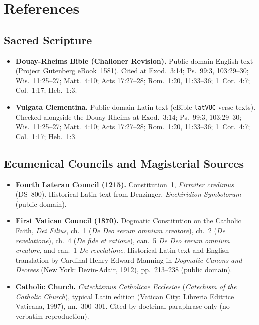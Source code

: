 \section{References}

\subsection*{Sacred Scripture}

\begin{itemize}
\item \textbf{Douay-Rheims Bible (Challoner Revision).} Public-domain English text (Project Gutenberg eBook~1581). Cited at Exod.~3:14; Ps.~99:3, 103:29--30; Wis.~11:25--27; Matt.~4:10; Acts 17:27--28; Rom.~1:20, 11:33--36; 1~Cor.~4:7; Col.~1:17; Heb.~1:3.
\item \textbf{Vulgata Clementina.} Public-domain Latin text (eBible \texttt{latVUC} verse texts). Checked alongside the Douay-Rheims at Exod.~3:14; Ps.~99:3, 103:29--30; Wis.~11:25--27; Matt.~4:10; Acts 17:27--28; Rom.~1:20, 11:33--36; 1~Cor.~4:7; Col.~1:17; Heb.~1:3.
\end{itemize}

\subsection*{Ecumenical Councils and Magisterial Sources}

\begin{itemize}
\item \textbf{Fourth Lateran Council (1215).} Constitution~1, \emph{Firmiter credimus} (DS~800). Historical Latin text from Denzinger, \emph{Enchiridion Symbolorum} (public domain).
\item \textbf{First Vatican Council (1870).} Dogmatic Constitution on the Catholic Faith, \emph{Dei Filius}, ch.~1 (\emph{De Deo rerum omnium creatore}), ch.~2 (\emph{De revelatione}), ch.~4 (\emph{De fide et ratione}), can.~5 \emph{De Deo rerum omnium creatore}, and can.~1 \emph{De revelatione}. Historical Latin text and English translation by Cardinal Henry Edward Manning in \emph{Dogmatic Canons and Decrees} (New York: Devin-Adair, 1912), pp.~213--238 (public domain).
\item \textbf{Catholic Church.} \emph{Catechismus Catholicae Ecclesiae} (\emph{Catechism of the Catholic Church}), typical Latin edition (Vatican City: Libreria Editrice Vaticana, 1997), nn.~300--301. Cited by doctrinal paraphrase only (no verbatim reproduction).
\end{itemize}

